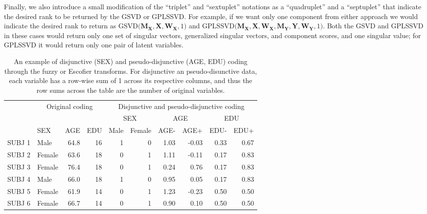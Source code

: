 \documentclass[12pt]{article}
\begin{document}
Finally, we also introduce a small modification of the ``triplet'' and
``sextuplet'' notations as a ``quadruplet'' and a ``septuplet'' that
indicate the desired rank to be returned by the GSVD or GPLSSVD. For
example, if we want only one component from either approach we would
indicate the desired rank to return as
\(\mathrm{GSVD(} {\mathbf M}_{{\mathbf X}}, {\mathbf X}, {\mathbf W}_{{\mathbf X}}, 1 \mathrm{)}\)
and
\(\mathrm{GPLSSVD(} {\mathbf M}_{\mathbf X}, {\mathbf X}, {\mathbf W}_{\mathbf X}, {\mathbf M}_{\mathbf Y}, {\mathbf Y}, {\mathbf W}_{\mathbf Y}, 1 \mathrm{)}\).
Both the GSVD and GPLSSVD in these cases would return only one set of
singular vectors, generalized singular vectors, and component scores,
and one singular value; for GPLSSVD it would return only one pair of
latent variables.

\begin{table}[!h]

\caption{\label{tab:unnamed-chunk-1}\label{table:disj} An example of disjunctive (SEX) and pseudo-disjunctive (AGE, EDU) coding through the fuzzy or Escofier transforms. For disjunctive an pseudo-disunctive data, each variable has a row-wise sum of 1 across its respective columns, and thus the row sums across the table are the number of original variables.}
\centering
\begin{tabular}{llrrrrrrrr}
\toprule
\multicolumn{1}{c}{ } & \multicolumn{3}{c}{Original coding} & \multicolumn{6}{c}{Disjunctive and pseudo-disjunctive coding} \\
\cmidrule(l{2pt}r{2pt}){2-4} \cmidrule(l{2pt}r{2pt}){5-10}
\multicolumn{4}{c}{ } & \multicolumn{2}{c}{SEX} & \multicolumn{2}{c}{AGE} & \multicolumn{2}{c}{EDU} \\
\cmidrule(l{2pt}r{2pt}){5-6} \cmidrule(l{2pt}r{2pt}){7-8} \cmidrule(l{2pt}r{2pt}){9-10}
  & SEX & AGE & EDU & Male & Female & AGE- & AGE+ & EDU- & EDU+\\
\midrule
SUBJ 1 & Male & 64.8 & 16 & 1 & 0 & 1.03 & -0.03 & 0.33 & 0.67\\
SUBJ 2 & Female & 63.6 & 18 & 0 & 1 & 1.11 & -0.11 & 0.17 & 0.83\\
SUBJ 3 & Female & 76.4 & 18 & 0 & 1 & 0.24 & 0.76 & 0.17 & 0.83\\
SUBJ 4 & Male & 66.0 & 18 & 1 & 0 & 0.95 & 0.05 & 0.17 & 0.83\\
SUBJ 5 & Female & 61.9 & 14 & 0 & 1 & 1.23 & -0.23 & 0.50 & 0.50\\
\addlinespace
SUBJ 6 & Female & 66.7 & 14 & 0 & 1 & 0.90 & 0.10 & 0.50 & 0.50\\
\bottomrule
\end{tabular}
\end{table}
\end{document}
